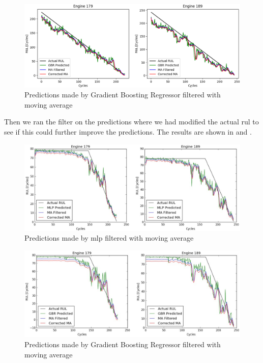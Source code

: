 \documentclass[english, a4paper]{report}
\begin{document}
{{{{                \begin{figure}[H]
                    \centering \includegraphics[width=1\textwidth]{NasaMAGBR}
                    \caption{Predictions made by Gradient Boosting Regressor filtered with moving average}
                    \label{fig:NasaMAGBR}
                \end{figure}
                
                Then we ran the filter on the predictions where we had modified the actual \gls{rul} to see if this could further improve the predictions. The results are shown in  and .
                
                \begin{figure}[H]
                    \centering \includegraphics[width=1\textwidth]{labeledMLPfiltered}
                    \caption{Predictions made by \gls{mlp} filtered with moving average}
                    \label{fig:labeledMLPfiltered}
                \end{figure}
                
                \begin{figure}[H]
                    \centering \includegraphics[width=1\textwidth]{labeledGBRfiltered}
                    \caption{Predictions made by Gradient Boosting Regressor filtered with moving average}
                    \label{fig:labeledGBRfiltered}
                \end{figure}
                
}}}}
\end{document}

